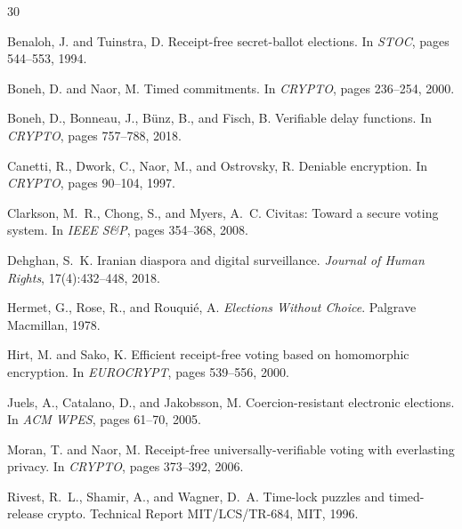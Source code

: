 \documentclass[11pt,a4paper]{article}
\begin{document}
\begin{thebibliography}{30}

Benaloh, J. and Tuinstra, D.
\newblock Receipt-free secret-ballot elections.
\newblock In \emph{STOC}, pages 544--553, 1994.

Boneh, D. and Naor, M.
\newblock Timed commitments.
\newblock In \emph{CRYPTO}, pages 236--254, 2000.

Boneh, D., Bonneau, J., B\"unz, B., and Fisch, B.
\newblock Verifiable delay functions.
\newblock In \emph{CRYPTO}, pages 757--788, 2018.

Canetti, R., Dwork, C., Naor, M., and Ostrovsky, R.
\newblock Deniable encryption.
\newblock In \emph{CRYPTO}, pages 90--104, 1997.

Clarkson, M.~R., Chong, S., and Myers, A.~C.
\newblock Civitas: Toward a secure voting system.
\newblock In \emph{IEEE S\&P}, pages 354--368, 2008.

Dehghan, S.~K.
\newblock Iranian diaspora and digital surveillance.
\newblock \emph{Journal of Human Rights}, 17(4):432--448, 2018.

Hermet, G., Rose, R., and Rouqui\'e, A.
\newblock \emph{Elections Without Choice}.
\newblock Palgrave Macmillan, 1978.

Hirt, M. and Sako, K.
\newblock Efficient receipt-free voting based on homomorphic encryption.
\newblock In \emph{EUROCRYPT}, pages 539--556, 2000.

Juels, A., Catalano, D., and Jakobsson, M.
\newblock Coercion-resistant electronic elections.
\newblock In \emph{ACM WPES}, pages 61--70, 2005.

Moran, T. and Naor, M.
\newblock Receipt-free universally-verifiable voting with everlasting privacy.
\newblock In \emph{CRYPTO}, pages 373--392, 2006.

Rivest, R.~L., Shamir, A., and Wagner, D.~A.
\newblock Time-lock puzzles and timed-release crypto.
\newblock Technical Report MIT/LCS/TR-684, MIT, 1996.


\end{thebibliography}
\end{document}
